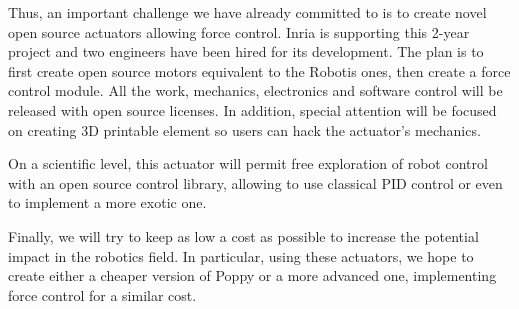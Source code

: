 Thus, an important challenge we have already committed to is to create novel open source actuators allowing force control. Inria is supporting this 2-year project and two engineers have been hired for its development. The plan is to first create open source motors equivalent to the Robotis ones, then create a force control module. All the work, mechanics, electronics and software control will be released with open source licenses. In addition, special attention will be focused on creating 3D printable element so users can hack the actuator’s mechanics.

On a scientific level, this actuator will permit free exploration of robot control with an open source control library, allowing to use classical PID control or even to implement a more exotic one.

Finally, we will try to keep as low a cost as possible to increase the potential impact in the robotics field. In particular, using these actuators, we hope to create either a cheaper version of Poppy or a more advanced one, implementing force control for a similar cost.



